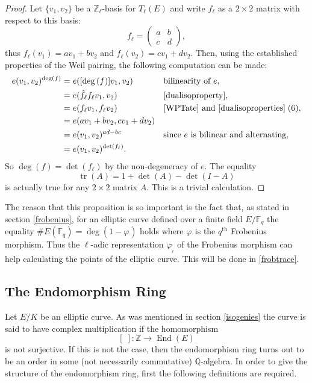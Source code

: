\documentclass{article}
\numberwithin{equation}{section}
\theoremstyle{definition}
\newcommand{\QQ}{{\mathbb Q}} %
\newcommand{\ZZ}{{\mathbb Z}} %
\newcommand{\FF}[1]{{\mathbb F}_{#1}} %
\newcommand{\frob}[1][]{\varphi_{#1}} %
\newcommand{\degree}[1]{\operatorname{deg} \left(#1\right)} %
\newcommand{\detm}[1]{\operatorname{det} \left(#1\right)} %
\newcommand{\tr}[1]{\operatorname{tr} \left(#1\right)} %
\newcommand{\Endring}[1]{\operatorname{End} (#1)} %
\begin{document}
\begin{proof}
Let $\{v_1,v_2\}$ be a $\ZZ_\ell$-basis for $T_\ell(E)$ and write $f_\ell$ as a $2 \times 2$ matrix with respect to this basis: $$f_\ell=\begin{pmatrix} a & b\\ c & d \end{pmatrix},$$ thus $f_\ell(v_1) = av_1+bv_2$ and $f_\ell(v_2)=cv_1+dv_2$. Then, using the established properties of the Weil pairing, the following computation can be made:
\begin{align*}
e(v_1,v_2)^{\degree{f}} &= e([\degree{f}]v_1,v_2) &&\text{bilinearity of }e,\\
&= e(\hat{f_\ell}f_\ell v_1,v_2) &&\ref{dualisoproperty},\\
&= e(f_\ell v_1,f_\ell v_2) &&\ref{WPTate} \text{ and } \ref{dualisoproperties}\;(6),\\
&= e(av_1+bv_2,cv_1+dv_2)\\
&= e(v_1,v_2)^{ad-bc} &&\text{since } e \text{ is bilinear and alternating},\\
&= e(v_1,v_2)^{\text{det}(f_\ell)}.
\end{align*}
So $\degree{f}=\detm{f_\ell}$ by the non-degeneracy of $e$. The equality $$\tr{A}=1+\detm{A}-\detm{I-A}$$ is actually true for any $2 \times 2$ matrix $A$. This is a trivial calculation. 
\end{proof}

The reason that this proposition is so important is the fact that, as stated in section \ref{frobenius}, for an elliptic curve defined over a finite field $E/\FF{q}$ the equality $\#E(\FF{q})=\degree{1-\frob}$ holds where $\frob$ is the $q^\text{th}$ Frobenius morphism. Thus the $\ell$-adic representation $\frob_\ell$ of the Frobenius morphism can help calculating the points of the elliptic curve. This will be done in \ref{frobtrace}.





\subsection{The Endomorphism Ring}\label{endring}
Let $E/K$ be an elliptic curve. As was mentioned in section \ref{isogenies} the curve is said to have complex multiplication if the homomorphism $$[\;]:\ZZ \rightarrow \Endring{E}$$ is not surjective. If this is not the case, then the endomorphism ring turns out to be an order in some (not necessarily commutative) $\QQ$-algebra. In order to give the structure of the endomorphism ring, first the following definitions are required.
\end{document}
